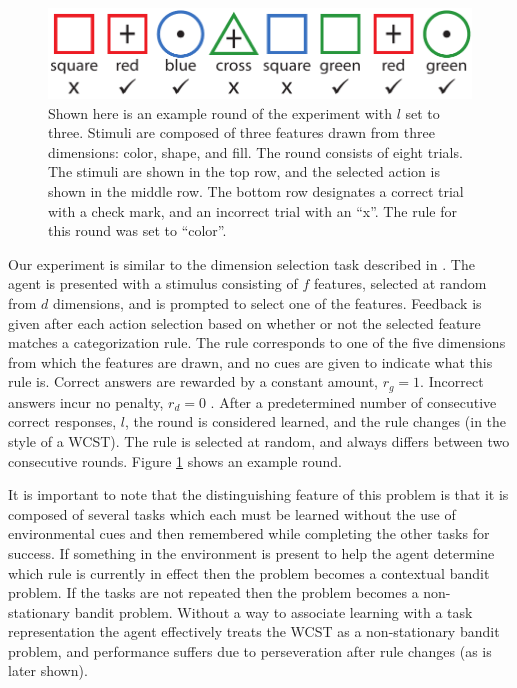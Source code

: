\documentclass[10pt,letterpaper]{article}
\begin{document}
\begin{figure}[t!]
    \centering
    \includegraphics[scale=.55]{images/exp_demo.pdf}
    \caption[]{Shown here is an example round of the experiment with $l$ set to three. Stimuli are composed of three features drawn from three dimensions: color, shape, and fill. The round consists of eight trials. The stimuli are shown in the top row, and the selected action is shown in the middle row. The bottom row designates a correct trial with a check mark, and an incorrect trial with an ``x''. The rule for this round was set to ``color''.}
    \label{fig:exp_demo}
\end{figure}

Our experiment is similar to the dimension selection task described in \cite{rougier_prefrontal_2005}. The agent is presented with a stimulus consisting of $f$ features, selected at random from $d$ dimensions, and is prompted to select one of the features. Feedback is given after each action selection based on whether or not the selected feature matches a categorization rule. The rule corresponds to one of the five dimensions from which the features are drawn, and no cues are given to indicate what this rule is. Correct answers are rewarded by a constant amount, $r_g = 1$. Incorrect answers incur no penalty, $r_d = 0$ . After a predetermined number of consecutive correct responses, $l$, the round is considered learned, and the rule changes (in the style of a WCST). The rule is selected at random, and always differs between two consecutive rounds. Figure \ref{fig:exp_demo} shows an example round.

It is important to note that the distinguishing feature of this problem is that it is composed of several tasks which each must be learned without the use of environmental cues and then remembered while completing the other tasks for success. If something in the environment is present to help the agent determine which rule is currently in effect then the problem becomes a contextual bandit problem. If the tasks are not repeated then the problem becomes a non-stationary bandit problem. Without a way to associate learning with a task representation the agent effectively treats the WCST as a non-stationary bandit problem, and performance suffers due to perseveration after rule changes (as is later shown). 
\end{document}
